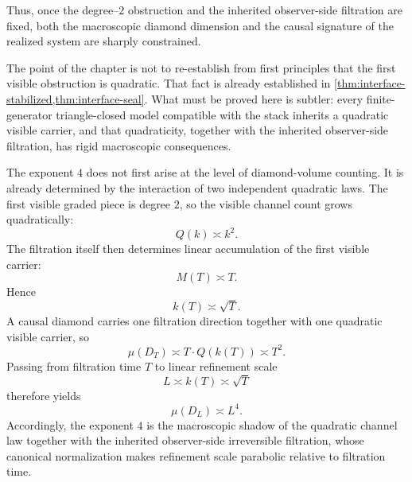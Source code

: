 Thus, once the degree--\(2\) obstruction and the inherited
observer-side filtration are fixed, both the macroscopic diamond
dimension and the causal signature of the realized system are sharply
constrained.
\begin{remark}
	The point of the chapter is not to re-establish from first principles
	that the first visible obstruction is quadratic.  That fact is already
	established in
	\cref{thm:interface-stabilized,thm:interface-seal}.  What must be
	proved here is subtler:
	every finite-generator triangle-closed model compatible with the stack
	inherits a quadratic visible carrier, and that quadraticity, together
	with the inherited observer-side filtration, has rigid macroscopic
	consequences.
\end{remark}
\begin{remark}
	The exponent \(4\) does not first arise at the level of
	diamond-volume counting.  It is already determined by the interaction of two
	independent quadratic laws.
	The first visible graded piece is degree \(2\), so the visible channel
	count grows quadratically:
	\[
		Q(k)\asymp k^2.
	\]
	The filtration itself then determines linear accumulation of the first
	visible carrier:
	\[
		M(T)\asymp T.
	\]
	Hence
	\[
		k(T)\asymp \sqrt T.
	\]
	A causal diamond carries one filtration direction together with one
	quadratic visible carrier, so
	\[
		\mu(D_T)\asymp T\cdot Q(k(T))\asymp T^2.
	\]
	Passing from filtration time \(T\) to linear refinement scale
	\[
		L\asymp k(T)\asymp \sqrt T
	\]
	therefore yields
	\[
		\mu(D_L)\asymp L^4.
	\]
	Accordingly, the exponent \(4\) is the macroscopic shadow of the
	quadratic channel law together with the inherited observer-side
	irreversible filtration, whose canonical normalization makes
	refinement scale parabolic relative to filtration time.
\end{remark}
